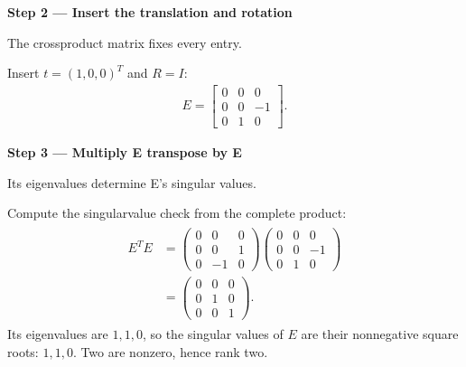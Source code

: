 \documentclass[letterpaper,11pt,english,openany,oneside]{jupyterBook}
\begin{document}
\par

\par\medskip{}
{\color{QuizStepRed}\bfseries Step 2 — Insert the translation and rotation}\par\smallskip

\sphinxAtStartPar
{} The cross\sphinxhyphen{}product matrix fixes every entry.

\sphinxAtStartPar
Insert {\color{QuizMathBlue} \(t=(1,0,0)^T\)} and {\color{QuizMathBlue} \(R=I\)}:
{\color{QuizMathBlue} \begin{equation*}
\begin{split}
\boxed{E=\begin{bmatrix}0&0&0\\0&0&-1\\0&1&0\end{bmatrix}}.
\end{split}
\end{equation*}}
\par

\par\medskip{}
{\color{QuizStepRed}\bfseries Step 3 — Multiply E transpose by E}\par\smallskip

\sphinxAtStartPar
{} Its eigenvalues determine E’s singular values.

\sphinxAtStartPar
Compute the singular\sphinxhyphen{}value check from the complete product:
{\color{QuizMathBlue} \begin{equation*}
\begin{split}
\begin{aligned}
E^TE&=\begin{pmatrix}0&0&0\\0&0&1\\0&-1&0\end{pmatrix}
\begin{pmatrix}0&0&0\\0&0&-1\\0&1&0\end{pmatrix}\\
&=\begin{pmatrix}0&0&0\\0&1&0\\0&0&1\end{pmatrix}.
\end{aligned}
\end{split}
\end{equation*}}
\sphinxAtStartPar
Its eigenvalues are {\color{QuizMathBlue} \(1,1,0\)}, so the singular values of {\color{QuizMathBlue} \(E\)} are their nonnegative square roots: {\color{QuizMathBlue} \(1,1,0\)}. Two are nonzero, hence rank two.
\end{document}
